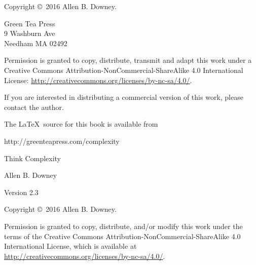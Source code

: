 \documentclass[12pt]{book}
\newcommand{\thetitle}{Think Complexity}
\newcommand{\theauthors}{Allen B. Downey}
\newcommand{\theversion}{2.3}
\theoremstyle{exercise}
\begin{document}
\begin{latexonly}
\begin{flushright}
\vfill

\end{flushright}


\pagebreak
\thispagestyle{empty}

Copyright \copyright ~2016 \theauthors.



\vspace{0.2in}

\begin{flushleft}
Green Tea Press       \\
9 Washburn Ave \\
Needham MA 02492
\end{flushleft}

Permission is granted to copy, distribute, transmit and adapt
this work under a Creative Commons
Attribution-NonCommercial-ShareAlike 4.0 International License:
\url{http://creativecommons.org/licenses/by-nc-sa/4.0/}.

If you are interested in distributing a commercial version of this
work, please contact the author.

The \LaTeX\ source for this book is available from

\begin{code}
      http://greenteapress.com/complexity
\end{code}


\cleardoublepage
\setcounter{tocdepth}{1}
\tableofcontents

\end{latexonly}



\begin{htmlonly}

\vspace{1em}

{\Large \thetitle}

{\large \theauthors}

Version \theversion

\vspace{1em}

Copyright \copyright ~2016 \theauthors.

Permission is granted to copy, distribute, and/or modify this work
under the terms of the Creative Commons
Attribution-NonCommercial-ShareAlike 4.0 International License, which is
available at \url{http://creativecommons.org/licenses/by-nc-sa/4.0/}.

\vspace{1em}

\setcounter{chapter}{-1}

\end{htmlonly}
\end{document}
